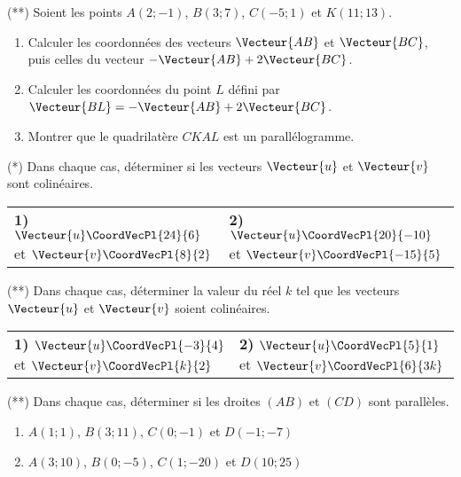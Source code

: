 \documentclass[a4paper]{article}
\begin{document}
\begin{exercice}{(**)}{}
 Soient les points $A(2;-1)$, $B(3;7)$, $C(-5;1)$ et $K(11;13)$.
 \begin{enumerate}
  \item Calculer les coordonnées des vecteurs $\Vecteur{AB}$ et $\Vecteur{BC}$, puis celles du vecteur $-\Vecteur{AB}+2\Vecteur{BC}$.
  \item Calculer les coordonnées du point $L$ défini par $\Vecteur{BL}=-\Vecteur{AB}+2\Vecteur{BC}$.
  \item Montrer que le quadrilatère $CKAL$ est un parallélogramme.
\end{enumerate}
\end{exercice}

\begin{exercice}{(*)}{}
Dans chaque cas, déterminer si les vecteurs $\Vecteur{u}$ et $\Vecteur{v}$ sont colinéaires.
\begin{center}
  \begin{tabularx}{.95\linewidth}{X X}
  \textbf{1)}  $\Vecteur{u}\CoordVecPl{24}{6}$ et $\Vecteur{v}\CoordVecPl{8}{2}$ & \textbf{2)} $\Vecteur{u}\CoordVecPl{20}{-10}$ et $\Vecteur{v}\CoordVecPl{-15}{5}$\\
  \end{tabularx}
\end{center}
\end{exercice}

\begin{exercice}{(**)}{}
  Dans chaque cas, déterminer la valeur du réel $k$ tel que les vecteurs $\Vecteur{u}$ et $\Vecteur{v}$ soient colinéaires.
   \begin{center}
    \begin{tabularx}{.95\linewidth}{X X}
    \textbf{1)} $\Vecteur{u}\CoordVecPl{-3}{4}$ et $\Vecteur{v}\CoordVecPl{k}{2}$ & \textbf{2)} $\Vecteur{u}\CoordVecPl{5}{1}$ et $\Vecteur{v}\CoordVecPl{6}{3k}$\\
    \end{tabularx}
  \end{center}

  \end{exercice}

  \begin{exercice}{(**)}{}
    Dans chaque cas, déterminer si les droites $(AB)$ et $(CD)$ sont parallèles.
    \begin{enumerate}
      \item $A(1;1)$, $B(3;11)$, $C(0;-1)$ et $D(-1;-7)$
      \item $A(3;10)$, $B(0;-5)$, $C(1;-20)$ et $D(10;25)$
    \end{enumerate}
    \end{exercice}
\end{document}
